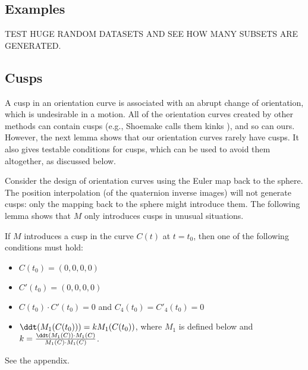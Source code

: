 \documentclass[12pt]{article}
\begin{document}

\subsection{Examples}

TEST HUGE RANDOM DATASETS AND SEE HOW MANY SUBSETS ARE GENERATED.

\clearpage

\subsection{Cusps}
\label{sec:cusp}



A cusp in an orientation curve is associated with an abrupt change
of orientation, which is undesirable in a motion.
All of the orientation curves created by other methods can contain cusps
(e.g., Shoemake calls them kinks \cite{shoemake85}), and so can ours.
However, the next lemma shows that our orientation curves rarely have cusps.
It also gives testable conditions for cusps, which can be used to avoid them altogether,
as discussed below.

Consider the design of orientation curves using the Euler map back to the sphere.
The position interpolation (of the quaternion inverse images) will not generate cusps:
only the mapping back to the sphere might introduce them.
The following lemma shows that $M$ only introduces cusps in unusual situations.

\begin{lemma}
\label{lem:cusp}
If $M$ introduces a cusp in the curve $C(t)$ at $t=t_0$,
then one of the following conditions must hold:
\begin{itemize}
\item
	$C(t_0) = (0,0,0,0)$
\item
	$C'(t_0) = (0,0,0,0)$
\item
	$C(t_0) \cdot C'(t_0) = 0$ and $C_4(t_0) = C'_4(t_0) = 0$
\item
	$\ddt(M_1(C(t_0))) = kM_1(C(t_0))$, where $M_1$ is defined below
	and $k = \frac{\ddt(M_1(C)) \cdot M_1(C)}{M_1(C) \cdot M_1(C)}$.
\end{itemize}
\end{lemma}
\prf
See the appendix.
\QED
\end{document}
